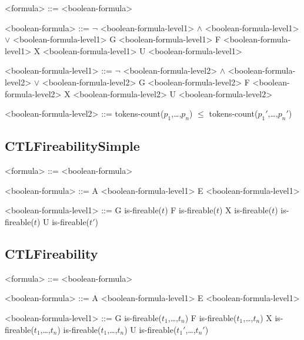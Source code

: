 \documentclass[10pt,english,a4paper]{article}
\begin{document}
\begin{grammar}

<formula> ::= <boolean-formula>

<boolean-formula> ::= $\lnot$ <boolean-formula-level1>
 $\wedge$ <boolean-formula-level1>
 $\vee$ <boolean-formula-level1>
\alt G <boolean-formula-level1>
\alt F <boolean-formula-level1>
\alt X <boolean-formula-level1>
 U <boolean-formula-level1>

<boolean-formula-level1> ::= $\lnot$ <boolean-formula-level2>
 $\wedge$ <boolean-formula-level2>
 $\vee$ <boolean-formula-level2>
\alt G <boolean-formula-level2>
\alt F <boolean-formula-level2>
\alt X <boolean-formula-level2>
 U <boolean-formula-level2>

<boolean-formula-level2> ::= tokens-count($p_1$,\dots,$p_n$) $\leq$ tokens-count($p_1'$,\dots,$p_n'$)

\end{grammar}

\subsection{CTLFireabilitySimple}

\begin{grammar}

<formula> ::= <boolean-formula>

<boolean-formula> ::= A <boolean-formula-level1>
\alt E <boolean-formula-level1>

<boolean-formula-level1> ::= G is-fireable($t$)
\alt F is-fireable($t$)
\alt X is-fireable($t$)
\alt is-fireable($t$) U is-fireable($t'$)

\end{grammar}


\subsection{CTLFireability}

\begin{grammar}

<formula> ::= <boolean-formula>

<boolean-formula> ::= A <boolean-formula-level1>
\alt E <boolean-formula-level1>

<boolean-formula-level1> ::= G is-fireable($t_1$,\dots,$t_n$)
\alt F is-fireable($t_1$,\dots,$t_n$)
\alt X is-fireable($t_1$,\dots,$t_n$)
\alt is-fireable($t_1$,\dots,$t_n$) U is-fireable($t_1'$,\dots,$t_n'$)

\end{grammar}
\end{document}
